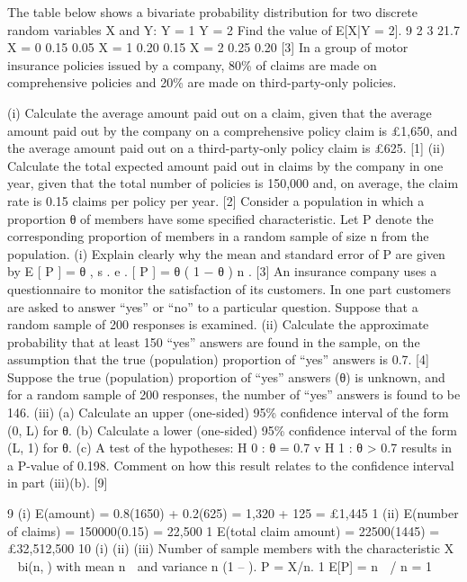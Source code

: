 \documentclass[a4paper,12pt]{article}
\begin{document}
\begin{enumerate}
[Total 8]
The table below shows a bivariate probability distribution for two discrete random
variables X and Y:
Y = 1
Y = 2
Find the value of E[X|Y = 2].
9
2
3
21.7
X = 0
0.15
0.05
X = 1
0.20
0.15
X = 2
0.25
0.20
[3]
In a group of motor insurance policies issued by a company, 80\% of claims are made on comprehensive policies and 20\% are made on third-party-only policies.

(i) Calculate the average amount paid out on a claim, given that the average amount paid out by the company on a comprehensive policy claim is £1,650, and the average amount paid out on a third-party-only policy claim is £625.
[1]
(ii) Calculate the total expected amount paid out in claims by the company in one year, given that the total number of policies is 150,000 and, on average, the claim rate is 0.15 claims per policy per year.
[2]
Consider a population in which a proportion θ of members have some specified characteristic. Let P denote the corresponding proportion of members in a random sample of size n from the population.
(i)
Explain clearly why the mean and standard error of P are given by
E [ P ] = θ ,
s . e . [ P ] =
θ ( 1 − θ )
n
.
[3]
An insurance company uses a questionnaire to monitor the satisfaction of its customers.
In one part customers are asked to answer “yes” or “no” to a particular question.
Suppose that a random sample of 200 responses is examined.
(ii)
Calculate the approximate probability that at least 150 “yes” answers are found in the sample, on the assumption that the true (population) proportion of “yes” answers is 0.7.
[4]
Suppose the true (population) proportion of “yes” answers (θ) is unknown, and for a random sample of 200 responses, the number of “yes” answers is found to be 146.
(iii)
(a) Calculate an upper (one-sided) 95\% confidence interval of the form (0, L) for θ.
(b) Calculate a lower (one-sided) 95\% confidence interval of the form (L, 1) for θ.
(c) A test of the hypotheses:
H 0 : θ = 0.7 v H 1 : θ > 0.7
results in a P-value of 0.198.
Comment on how this result relates to the confidence interval in part
(iii)(b).
[9]

9
(i) E(amount) = 0.8(1650) + 0.2(625) = 1,320 + 125 = £1,445 1
(ii) E(number of claims) = 150000(0.15) = 22,500 1
E(total claim amount) = 22500(1445) = £32,512,500
10
(i)
(ii)
(iii)
Number of sample members with the characteristic X ~ bi(n,) with mean
n  and variance n (1 – ). P = X/n. 1
E[P] = n  / n = 1


\end{enumerate}
\end{document}
